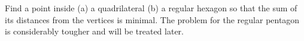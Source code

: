 Find a point inside (a) a quadrilateral (b) a regular hexagon so that the sum of its distances from the vertices is minimal. The problem for the regular pentagon is considerably tougher and will be treated later.
